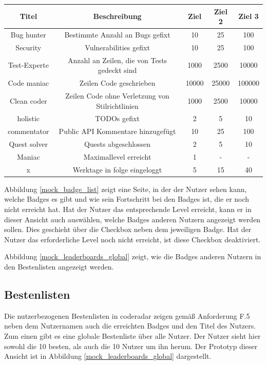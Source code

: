 \documentclass[
	oneside,  %
	ngerman, 
	final, 
	11pt, 
	a4paper, 
	1.1headlines, 
	headinclude=false, 
	footinclude=false, 
	mpinclude=false, 
	pagesize, 
	onecolumn, 
	titlepage, 
	parskip=half, 
	headsepline, 
	chapterprefix=false, 
	version=first, 
	listof=totoc, 
	bibliography=totoc, 
	toc=graduated, 
	fleqn
]{scrbook}
\begin{document}
\begin{center}
	\begin{tabular}{|c|c|c|c|c|}
		\hline
		Titel & Beschreibung & Ziel & Ziel 2 & Ziel 3 \\ \hline
		Bug hunter & Bestimmte Anzahl an Bugs gefixt & 10 & 25 & 100 \\ \hline
		Security & Vulnerabilities gefixt & 10 & 25 & 100 \\ \hline
		Test-Experte & Anzahl an Zeilen, die von Tests gedeckt sind & 1000 & 2500 & 10000 \\ \hline
		Code maniac & Zeilen Code geschrieben & 10000 & 25000 & 100000 \\ \hline
		Clean coder & Zeilen Code ohne Verletzung von Stilrichtlinien & 1000 & 2500 & 10000 \\ \hline
		holistic & TODOs gefixt & 2 & 5 & 10 \\ \hline
		commentator & Public API Kommentare hinzugefügt & 10 & 25 & 100 \\ \hline
		Quest solver & Quests abgeschlossen & 2 & 5 & 10 \\ \hline
		Maniac & Maximallevel erreicht & 1 & - & - \\ \hline
		x & Werktage in folge eingeloggt & 5 & 15 & 40 \\ \hline
	\end{tabular}
\end{center}

Abbildung \ref{mock_badge_list} zeigt eine Seite, in der der Nutzer sehen kann, welche Badges es gibt und wie sein Fortschritt bei den Badges ist, die er noch nicht erreicht hat.
Hat der Nutzer das entsprechende Level erreicht, kann er in dieser Ansicht auch auswählen, welche Badges anderen Nutzern angezeigt werden sollen.
Dies geschieht über die Checkbox neben dem jeweiligen Badge.
Hat der Nutzer das erforderliche Level noch nicht erreicht, ist diese Checkbox deaktiviert.

Abbildung \ref{mock_leaderboards_global} zeigt, wie die Badges anderen Nutzern in den Bestenlisten angezeigt werden.

\subsection{Bestenlisten}
\label{coderadar_Bestenlisten}
Die nutzerbezogenen Bestenlisten in coderadar zeigen gemäß Anforderung F.5 neben dem Nutzernamen auch die erreichten Badges und den Titel des Nutzers.
Zum einen gibt es eine globale Bestenliste über alle Nutzer.
Der Nutzer sieht hier sowohl die 10 besten, als auch die 10 Nutzer um ihn herum.
Der Prototyp dieser Ansicht ist in Abbildung \ref{mock_leaderboards_global} dargestellt.
\end{document}
